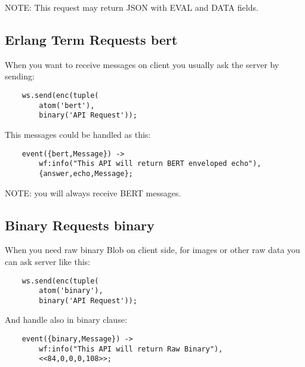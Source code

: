NOTE: This request may return JSON with EVAL and DATA fields.

\newpage
\subsection{Erlang Term Requests {\bf bert}}

When you want to receive  messages on client you usually ask the
server by sending:

\vspace{1\baselineskip}
\begin{lstlisting}
    ws.send(enc(tuple(
        atom('bert'),
        binary('API Request'));
\end{lstlisting}
\vspace{1\baselineskip}

This messages could be handled as this:

\vspace{1\baselineskip}
\begin{lstlisting}
    event({bert,Message}) ->
        wf:info("This API will return BERT enveloped echo"),
        {answer,echo,Message};
\end{lstlisting}
\vspace{1\baselineskip}

NOTE: you will always receive BERT messages.

\subsection{Binary Requests {\bf binary}}

When you need raw binary Blob on client side,
for images or other raw data you can ask server like this:

\vspace{1\baselineskip}
\begin{lstlisting}
    ws.send(enc(tuple(
        atom('binary'),
        binary('API Request'));
\end{lstlisting}
\vspace{1\baselineskip}

And handle also in binary clause:

\vspace{1\baselineskip}
\begin{lstlisting}
    event({binary,Message}) ->
        wf:info("This API will return Raw Binary"),
        <<84,0,0,0,108>>;
\end{lstlisting}
\vspace{1\baselineskip}

